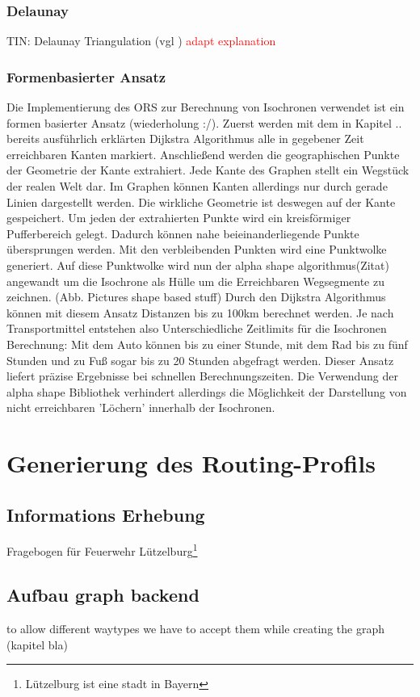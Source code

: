 \documentclass[10pt,a4paper]{article}
\newcommand\todo[1]{\textcolor{red}{#1}}
\begin{document}
\subsubsection{Delaunay}
TIN: Delaunay Triangulation
(vgl \cite{isochrones})
\todo{adapt explanation}


\subsubsection{Formenbasierter Ansatz}
Die Implementierung des ORS zur Berechnung von Isochronen verwendet ist ein formen basierter Ansatz (wiederholung :/). Zuerst werden mit dem in Kapitel .. bereits ausführlich erklärten Dijkstra Algorithmus alle in gegebener Zeit erreichbaren Kanten markiert. Anschließend werden die geographischen Punkte der Geometrie der Kante extrahiert. Jede Kante des Graphen stellt ein Wegstück der realen Welt dar. Im Graphen können Kanten allerdings nur durch gerade Linien dargestellt werden. Die wirkliche Geometrie ist deswegen auf der Kante gespeichert. Um jeden der extrahierten Punkte wird ein kreisförmiger Pufferbereich gelegt. Dadurch können nahe beieinanderliegende Punkte übersprungen werden. Mit den verbleibenden Punkten wird eine Punktwolke generiert. Auf diese Punktwolke wird nun der alpha shape algorithmus(Zitat) angewandt um die Isochrone als Hülle um die Erreichbaren Wegsegmente zu zeichnen.
(Abb. Pictures shape based stuff)
Durch den Dijkstra Algorithmus können mit diesem Ansatz Distanzen bis zu 100km berechnet werden. Je nach Transportmittel entstehen also Unterschiedliche Zeitlimits für die Isochronen Berechnung: Mit dem Auto können bis zu einer Stunde, mit dem Rad bis zu fünf Stunden und zu Fuß sogar bis zu 20 Stunden abgefragt werden. Dieser Ansatz liefert präzise Ergebnisse bei schnellen Berechnungszeiten. Die Verwendung der alpha shape Bibliothek verhindert allerdings die Möglichkeit der Darstellung von nicht erreichbaren 'Löchern' innerhalb der Isochronen.


\section{Generierung des Routing-Profils}

\subsection{Informations Erhebung}
Fragebogen für Feuerwehr Lützelburg\footnote{Lützelburg ist eine stadt in Bayern}

\subsection{Aufbau graph backend}
to allow different waytypes we have to accept them while creating the graph (kapitel bla)
\end{document}

